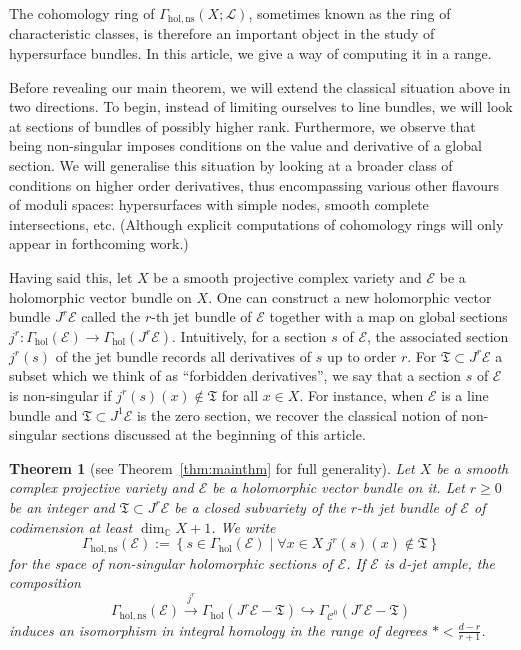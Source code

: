 \documentclass[a4paper]{amsart}
\newcommand{\bC}{\mathbb C}
\newcommand{\cE}{\mathcal E}
\newcommand{\cC}{\mathcal C}
\newcommand{\cL}{\mathcal L}
\newcommand{\fT}{\mathfrak T}
\newcommand{\lra}{\longrightarrow}
\theoremstyle{plain}
\newtheorem{theorem}{Theorem}[section]
\theoremstyle{definition}
\newcommand{\Gammahol}{\Gamma_{\mathrm{hol}}}
\begin{document}
The cohomology ring of $\Gamma_{\mathrm{hol,ns}}(X;\cL)$, sometimes known as the ring of characteristic classes, is therefore an important object in the study of hypersurface bundles. In this article, we give a way of computing it in a range.

\bigskip

Before revealing our main theorem, we will extend the classical situation above in two directions. To begin, instead of limiting ourselves to line bundles, we will look at sections of bundles of possibly higher rank. Furthermore, we observe that being non-singular imposes conditions on the value and derivative of a global section. We will generalise this situation by looking at a broader class of conditions on higher order derivatives, thus encompassing various other flavours of moduli spaces: hypersurfaces with simple nodes, smooth complete intersections, etc. (Although explicit computations of cohomology rings will only appear in forthcoming work.)

Having said this, let $X$ be a smooth projective complex variety and $\cE$ be a holomorphic vector bundle on $X$. One can construct a new holomorphic vector bundle $J^r\cE$ called the $r$-th jet bundle of $\cE$ together with a map on global sections $j^r \colon \Gammahol(\cE) \to \Gammahol(J^r\cE)$. Intuitively, for a section $s$ of $\cE$, the associated section $j^r(s)$ of the jet bundle records all derivatives of $s$ up to order $r$. For $\fT \subset J^r\cE$ a subset which we think of as ``forbidden derivatives'', we say that a section $s$ of $\cE$ is non-singular if $j^r(s)(x) \not\in \fT$ for all $x \in X$. For instance, when $\cE$ is a line bundle and $\fT \subset J^1\cE$ is the zero section, we recover the classical notion of non-singular sections discussed at the beginning of this article.
\begin{theorem}[see Theorem~\ref{thm:mainthm} for full generality]
Let $X$ be a smooth complex projective variety and $\cE$ be a holomorphic vector bundle on it. Let $r \geq 0$ be an integer and $\fT \subset J^r\cE$ be a closed subvariety of the $r$-th jet bundle of $\cE$ of codimension at least $\dim_\bC X + 1$. We write
\[
    \Gamma_{\mathrm{hol,ns}}\left( \cE \right) := \left\{ s \in \Gammahol(\cE) \mid \forall x \in X \ j^r(s)(x) \not\in \fT \right\}
\]
for the space of non-singular holomorphic sections of $\cE$. If $\cE$ is $d$-jet ample, the composition
\[
    \Gamma_{\mathrm{hol,ns}}\left( \cE \right) \overset{j^r}{\lra} \Gamma_{\mathrm{hol}}\left( J^r\cE - \fT \right) \hookrightarrow \Gamma_{\cC^0}\left( J^r\cE - \fT \right)
\]
induces an isomorphism in integral homology in the range of degrees $* < \frac{d-r}{r+1}$.
\end{theorem}
\end{document}
